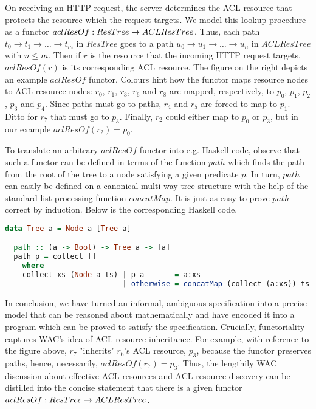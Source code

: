 On receiving an HTTP request, the server determines the ACL resource
that protects the resource which the request targets. We model this
lookup procedure as a functor $aclResOf : ResTree \rightarrow ACLResTree$.
Thus, each path $t_0 \rightarrow t_1 \rightarrow \ldots \rightarrow t_m$ in $ResTree$
goes to a path $u_0 \rightarrow u_1 \rightarrow \ldots \rightarrow u_n$
in $ACLResTree$ with $n \leq m$. Then if $r$ is the resource that
the incoming HTTP request targets, $aclResOf(r)$ is its corresponding
ACL resource. The figure on the right depicts an example $aclResOf$
functor. Colours hint how the functor maps resource nodes to ACL
resource nodes: $r_0$, $r_1$, $r_3$, $r_6$ and $r_8$ are mapped,
respectively, to $p_0$, $p_1$, $p_2$, $p_3$ and $p_4$. Since paths
must go to paths, $r_4$ and $r_5$ are forced to map to $p_1$. Ditto
for $r_7$ that must go to $p_3$. Finally, $r_2$ could either map to
$p_0$ or $p_3$, but in our example $aclResOf(r_2) = p_0$.

To translate an arbitrary $aclResOf$ functor into e.g. Haskell code,
observe that such a functor can be defined in terms of the function
$path$ which finds the path from the root of the tree to a node satisfying
a given predicate $p$. In turn, $path$ can easily be defined on a
canonical multi-way tree structure with the help of the standard
list processing function $concatMap$. It is just as easy to prove
$path$ correct by induction. Below is the corresponding Haskell code.
\begin{lstlisting}[language=Haskell]
  data Tree a = Node a [Tree a]

  path :: (a -> Bool) -> Tree a -> [a]
  path p = collect []
    where
    collect xs (Node a ts) | p a       = a:xs
                           | otherwise = concatMap (collect (a:xs)) ts
\end{lstlisting}

In conclusion, we have turned an informal, ambiguous specification
into a precise model that can be reasoned about mathematically and
have encoded it into a program which can be proved to satisfy the
specification. Crucially, functoriality captures WAC's idea of ACL
resource inheritance. For example, with reference to the figure above,
$r_7$ "inherits" $r_6$'s ACL resource, $p_3$, because the functor
preserves paths, hence, necessarily, $aclResOf(r_7) = p_3$. Thus,
the lengthily WAC discussion about effective ACL resources and ACL
resource discovery can be distilled into the concise statement that
there is a given functor  $aclResOf : ResTree \rightarrow ACLResTree$.


